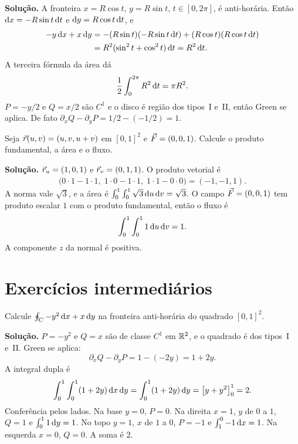 \documentclass[11pt,a4paper]{article}
\begin{document}
\noindent\textbf{Solução.}
A fronteira $x=R\cos t$, $y=R\sin t$, $t\in[0,2\pi]$, é anti-horária. Então $\mathrm{d} x=-R\sin t\,\mathrm{d} t$ e $\mathrm{d} y=R\cos t\,\mathrm{d} t$, e
\begin{align*}
-y\,\mathrm{d} x+x\,\mathrm{d} y
&=-(R\sin t)(-R\sin t\,\mathrm{d} t)+(R\cos t)(R\cos t\,\mathrm{d} t)\\
&=R^2(\sin^2 t+\cos^2 t)\,\mathrm{d} t
=R^2\,\mathrm{d} t.
\end{align*}
A terceira fórmula da área dá
\[
\frac12\int_0^{2\pi} R^2\,\mathrm{d} t=\pi R^2.
\]
$P=-y/2$ e $Q=x/2$ são $C^1$ e o disco é região dos tipos~I e~II, então Green se aplica. De fato $\partial_x Q-\partial_y P=1/2-(-1/2)=1$.

\begin{exercicio}
Seja $\vec{r}(u,v)=(u,v,u+v)$ em $[0,1]^2$ e $\vec{F}=(0,0,1)$. Calcule o produto fundamental, a área e o fluxo.
\end{exercicio}

\noindent\textbf{Solução.}
$\vec{r}_u=(1,0,1)$ e $\vec{r}_v=(0,1,1)$. O produto vetorial é
\begin{align*}
\bigl(0\cdot 1-1\cdot 1,\;
1\cdot 0-1\cdot 1,\;
1\cdot 1-0\cdot 0\bigr)
=(-1,-1,1).
\end{align*}
A norma vale $\sqrt{3}$, e a área é $\int_0^1\int_0^1\sqrt{3}\,\mathrm{d} u\,\mathrm{d} v=\sqrt{3}$. O campo $\vec{F}=(0,0,1)$ tem produto escalar $1$ com o produto fundamental, então o fluxo é
\[
\int_0^1\int_0^1 1\,\mathrm{d} u\,\mathrm{d} v=1.
\]
A componente $z$ da normal é positiva.

\section{Exercícios intermediários}

\begin{exercicio}
Calcule $\oint_C -y^2\,\mathrm{d} x+x\,\mathrm{d} y$ na fronteira anti-horária do quadrado $[0,1]^2$.
\end{exercicio}

\noindent\textbf{Solução.}
$P=-y^2$ e $Q=x$ são de classe $C^1$ em $\mathbb{R}^2$, e o quadrado é dos tipos~I e~II. Green se aplica:
\[
\partial_x Q-\partial_y P=1-(-2y)=1+2y.
\]
A integral dupla é
\[
\int_0^1\int_0^1(1+2y)\,\mathrm{d} x\,\mathrm{d} y
=\int_0^1(1+2y)\,\mathrm{d} y
=\bigl[y+y^2\bigr]_0^1=2.
\]
Conferência pelos lados. Na base $y=0$, $P=0$. Na direita $x=1$, $y$ de $0$ a $1$, $Q=1$ e $\int_0^1 1\,\mathrm{d} y=1$. No topo $y=1$, $x$ de $1$ a $0$, $P=-1$ e $\int_1^0 -1\,\mathrm{d} x=1$. Na esquerda $x=0$, $Q=0$. A soma é $2$.
\end{document}

